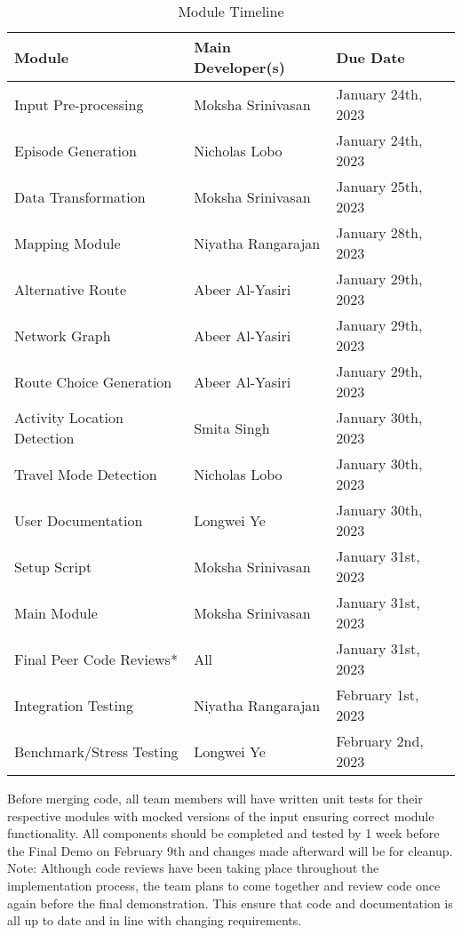 \documentclass[12pt, titlepage]{article}
\begin{document}
\begin{table}[H] 
	\begin{tabularx}{\textwidth}{|X|X|X|}
		\hline
		\textbf{Module} & \textbf{Main Developer(s)} & \textbf{Due Date}\\
		\hline
		Input Pre-processing & Moksha Srinivasan & 
		January 24th, 2023  \\
		\hline
		Episode Generation & Nicholas Lobo & 
		January 24th, 2023 \\
		\hline
		Data Transformation & Moksha Srinivasan &
		January 25th, 2023 \\
		\hline
		Mapping Module & Niyatha Rangarajan &
		January 28th, 2023 \\
		\hline
		Alternative Route  & Abeer Al-Yasiri &
		January 29th, 2023 \\
		\hline
		Network Graph  & Abeer Al-Yasiri &
		January 29th, 2023 \\
		\hline
		Route Choice Generation & Abeer Al-Yasiri &
		January 29th, 2023 \\
		\hline
		Activity Location Detection & Smita Singh &
		January 30th, 2023 \\
		\hline 
		Travel Mode Detection & Nicholas Lobo & 
		January 30th, 2023 \\
		\hline 
		User Documentation & Longwei Ye &
		January 30th, 2023 \\
		\hline
		Setup Script & Moksha Srinivasan &
		January 31st, 2023 \\
		\hline 
		Main Module & Moksha Srinivasan &
		January 31st, 2023 \\
		\hline
	    Final Peer Code Reviews* & All &
		January 31st, 2023 \\
		\hline
		Integration Testing & Niyatha Rangarajan &
		February 1st, 2023 \\
		\hline
		Benchmark/Stress Testing & Longwei Ye & 
		February 2nd, 2023 \\
		\hline
	\end{tabularx}
	\caption{Module Timeline}
\end{table}

Before merging code, all team members will have written unit tests for their respective modules with mocked versions of the input ensuring correct module functionality. All components should be completed and tested by 1 week before the Final Demo on February 9th and changes made afterward will be for cleanup.\\

\noindent *Note: Although code reviews have been taking place throughout the implementation process, the team plans to come together and review code once again before the final demonstration. This ensure that code and documentation is all up to date and in line with changing requirements. 
\end{document}
